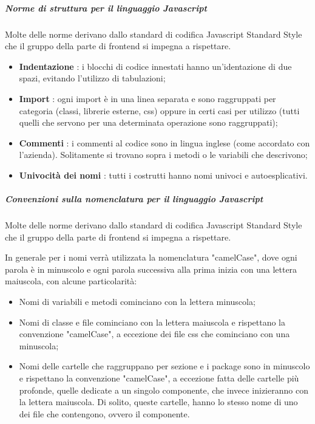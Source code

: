\subparagraph{Norme di struttura per il linguaggio Javascript}
Molte delle norme derivano dallo standard di codifica Javascript Standard Style che il gruppo della parte di frontend si impegna a rispettare.

\begin{itemize}
\item \textbf{Indentazione} : i blocchi di codice innestati hanno un'identazione di due spazi, evitando l'utilizzo di tabulazioni;
\item \textbf{Import} : ogni import è in una linea separata e sono raggruppati per categoria (classi, librerie esterne, css) oppure in certi casi per utilizzo (tutti quelli che servono per una determinata operazione sono raggruppati); 
\item \textbf{Commenti} : i commenti al codice sono in lingua inglese (come accordato con l'azienda). Solitamente si trovano sopra i metodi o le variabili che descrivono;
\item \textbf{Univocità dei nomi} : tutti i costrutti hanno nomi univoci e autoesplicativi.
\end{itemize}

\subparagraph{Convenzioni sulla nomenclatura per il linguaggio Javascript}
Molte delle norme derivano dallo standard di codifica Javascript Standard Style che il gruppo della parte di frontend si impegna a rispettare.

In generale per i nomi verrà utilizzata la nomenclatura "camelCase", dove ogni parola è in minuscolo e ogni parola successiva alla prima inizia con una lettera maiuscola, con alcune particolarità:
\begin{itemize}
\item Nomi di variabili e metodi cominciano con la lettera minuscola;
\item Nomi di classe e file cominciano con la lettera maiuscola e rispettano la convenzione "camelCase", a eccezione dei file css che cominciano con una minuscola;
\item Nomi delle cartelle che raggruppano per sezione e i package sono in minuscolo e rispettano la convenzione "camelCase", a eccezione fatta delle cartelle più profonde, quelle dedicate a un singolo componente, che invece inizieranno con la lettera maiuscola. Di solito, queste cartelle, hanno lo stesso nome di uno dei file che contengono, ovvero il componente.
\end{itemize}


